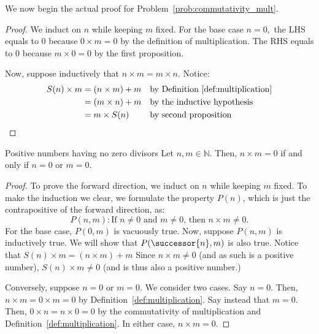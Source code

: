 We now begin the actual proof for Problem~\ref{prob:commutativity_mult}.
\begin{proof}
    We induct on $n$ while keeping $m$ fixed. 
    For the base case $n = 0,$ the LHS equals to 0 because $0 \times m = 0$ by the definition of multiplication.
    The RHS equals to 0 because $m \times 0 = 0$ by the first proposition.

    Now, suppose inductively that $n \times m = m \times n.$ Notice:
    \begin{align*}
        S(n) \times m &= (n \times m) + m &&\text{by Definition~\ref{def:multiplication}} \\
        &= (m \times n) + m &&\text{by the inductive hypothesis} \\
        &= m \times S(n) &&\text{by second proposition} \\
    \end{align*}
\end{proof}
\begin{problem}{Positive numbers having no zero divisors}
    Let $n, m \in \mathbb{N}.$
    Then, $n \times m = 0$ if and only if $n = 0$ or $m = 0.$
\end{problem}
\begin{proof}
    To prove the forward direction, we induct on $n$ while keeping $m$ fixed.
    To make the induction we clear, we formulate the property $P(n)$, which is just the contrapositive of the forward direction, as:
    $$P(n, m): \text{If } n \neq 0 \text{ and } m \neq 0 \text{, then } n \times m \neq 0.$$
    For the base case, $P(0, m)$ is vacuously true.
    Now, suppose $P(n, m)$ is inductively true. 
    We will show that $P(\successor{n}, m)$ is also true. 
    Notice that $S(n) \times m = (n \times m) + m$
    Since $n \times m \neq 0$ (and as such is a positive number), $S(n) \times m \neq 0$ (and is thus also a positive number.) 


    Conversely, suppose $n = 0$ or $m = 0.$ We consider two cases.
    Say $n = 0.$ Then, $n \times m = 0 \times m = 0$ by Definition~\ref{def:multiplication}.
    Say instead that $m = 0.$ Then, $0 \times n = n \times 0 = 0$ by the commutativity of multiplication and Definition~\ref{def:multiplication}.
    In either case, $n \times m = 0.$
\end{proof}

